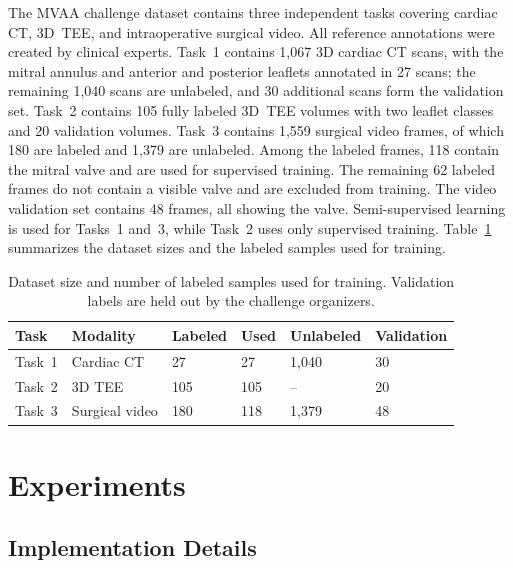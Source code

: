 \documentclass[runningheads]{llncs}
\begin{document}
The MVAA challenge dataset contains three independent tasks covering
cardiac CT, 3D~TEE, and intraoperative surgical video. All reference
annotations were created by clinical experts. Task~1 contains 1{,}067
3D cardiac CT scans, with the mitral annulus and anterior and posterior
leaflets annotated in 27 scans; the remaining 1{,}040 scans are
unlabeled, and 30 additional scans form the validation set. Task~2
contains 105 fully labeled 3D~TEE volumes with two leaflet classes and
20 validation volumes. Task~3 contains 1{,}559 surgical video frames,
of which 180 are labeled and 1{,}379 are unlabeled. Among the labeled
frames, 118 contain the mitral valve and are used for supervised
training. The remaining 62 labeled frames do not contain a visible
valve and are excluded from training. The video validation set contains
48 frames, all showing the valve. Semi-supervised learning is used for
Tasks~1 and~3, while Task~2 uses only supervised training.
Table~\ref{tab:data} summarizes the dataset sizes and the labeled
samples used for training.

\begin{table}[t]
\caption{Dataset size and number of labeled samples used for training.
Validation labels are held out by the challenge organizers.}
\label{tab:data}
\centering
\begin{tabular}{llllll}
\toprule
Task & Modality & Labeled & Used & Unlabeled & Validation \\
\midrule
Task~1 & Cardiac CT     & 27  & 27  & 1{,}040 & 30 \\
Task~2 & 3D TEE         & 105 & 105 & --      & 20 \\
Task~3 & Surgical video & 180 & 118 & 1{,}379 & 48 \\
\bottomrule
\end{tabular}
\end{table}

\section{Experiments}
\label{sec:experiments}

\subsection{Implementation Details}
\end{document}
